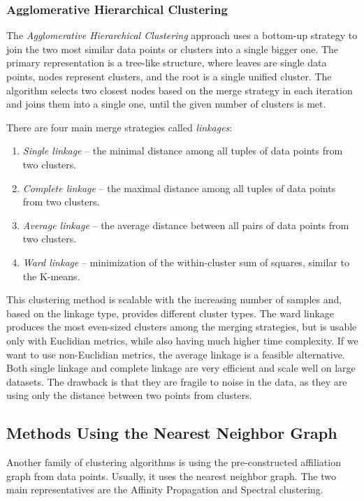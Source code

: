 \subsubsection{Agglomerative Hierarchical Clustering}
The \textit{Agglomerative Hierarchical Clustering} approach \cite{vis:agg-cluster, vis:kmeans} uses a bottom-up strategy to join the two most similar data points or clusters into a single bigger one. The primary representation is a tree-like structure, where leaves are single data points, nodes represent clusters, and the root is a single unified cluster. The algorithm selects two closest nodes based on the merge strategy in each iteration and joins them into a single one, until the given number of clusters is met.

There are four main merge strategies called \textit{linkages}:
\begin{enumerate}
    \item \textit{Single linkage} -- the minimal distance among all tuples of data points from two clusters.
    \item \textit{Complete linkage} -- the maximal distance among all tuples of data points from two clusters.
    \item \textit{Average linkage} -- the average distance between all pairs of data points from two clusters.
    \item \textit{Ward linkage} -- minimization of the within-cluster sum of squares, similar to the K-means.
\end{enumerate}
This clustering method is scalable with the increasing number of samples and, based on the linkage type, provides different cluster types. The ward linkage produces the most even-sized clusters among the merging strategies, but is usable only with Euclidian metrics, while also having much higher time complexity. If we want to use non-Euclidian metrics, the average linkage is a feasible alternative. Both single linkage and complete linkage are very efficient and scale well on large datasets. The drawback is that they are fragile to noise in the data, as they are using only the distance between two points from clusters.

\subsection{Methods Using the Nearest Neighbor Graph}
Another family of clustering algorithms is using the pre-constructed affiliation graph from data points. Usually, it uses the nearest neighbor graph. The two main representatives are the Affinity Propagation and Spectral clustering. 
